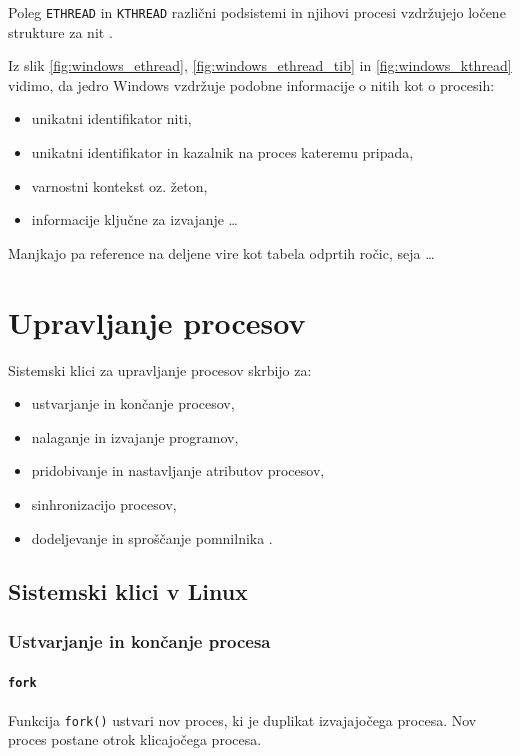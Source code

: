 \documentclass[a4paper,12pt,openright]{book}
\begin{document}
Poleg \texttt{ETHREAD} in \texttt{KTHREAD} različni podsistemi in njihovi procesi vzdržujejo ločene strukture za nit \cite{Yosifovich_Russinovich_Solomon_Ionescu_2017}.

Iz slik \ref{fig:windows_ethread}, \ref{fig:windows_ethread_tib} in \ref{fig:windows_kthread} vidimo, da jedro Windows vzdržuje podobne informacije o nitih kot o procesih:
\begin{itemize}
	\item unikatni identifikator niti,
	\item unikatni identifikator in kazalnik na proces kateremu pripada,
	\item varnostni kontekst oz. žeton,
	\item informacije ključne za izvajanje \dots
\end{itemize}
Manjkajo pa reference na deljene vire kot tabela odprtih ročic, seja \dots

\chapter{Upravljanje procesov}

Sistemski klici za upravljanje procesov skrbijo za:
\begin{itemize}
	\item ustvarjanje in končanje procesov,
	\item nalaganje in izvajanje programov,
	\item pridobivanje in nastavljanje atributov procesov,
	\item sinhronizacijo procesov,
	\item dodeljevanje in sproščanje pomnilnika \cite{Silberschatz_Galvin_Gagne_2018}.
\end{itemize}

\section{Sistemski klici v Linux}

\subsection{Ustvarjanje in končanje procesa}

\subsubsection{\texttt{fork}}

Funkcija \texttt{fork()} ustvari nov proces, ki je duplikat izvajajočega procesa.
Nov proces postane otrok klicajočega procesa.
\end{document}

